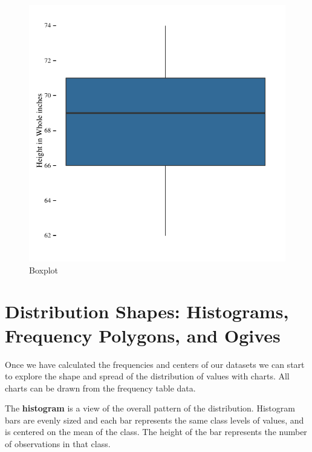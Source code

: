 \documentclass[nohyper,justified]{tufte-handout}\usepackage[]{graphicx}\usepackage[]{color}
\makeatletter
\def\maxwidth{ %
  \ifdim\Gin@nat@width>\linewidth
    \linewidth
  \else
    \Gin@nat@width
  \fi
}
\newenvironment{knitrout}{}{} %
\makeatother
\begin{document}
\begin{knitrout}
\color{fgcolor}\begin{figure}

{\centering \includegraphics[width=\maxwidth]{figure/graphics-boxplot-1} 

}

\caption[Boxplot]{Boxplot}\label{fig:boxplot}
\end{figure}


\end{knitrout}

\section{Distribution Shapes: Histograms, Frequency Polygons, and Ogives}

Once we have calculated the frequencies and centers of our datasets we can start to explore the shape and spread of the distribution of values with charts. All charts can be drawn from the frequency table data.

The \textbf{histogram} is a view of the overall pattern of the distribution. Histogram bars are evenly sized and each bar represents the same class levels of values, and is centered on the mean of the class. The height of the bar represents the number of observations in that class.
\end{document}
